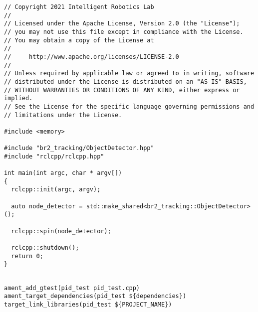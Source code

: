  \footnotesize
\begin{tcolorbox}[sharp corners, colframe=gray!80, colback=LightGray, left=0pt, top=0pt, bottom=0pt, title=\texttt{br2\_tracking/src/object\_detector\_main.cpp}]
  \begin{verbatim}
// Copyright 2021 Intelligent Robotics Lab
//
// Licensed under the Apache License, Version 2.0 (the "License");
// you may not use this file except in compliance with the License.
// You may obtain a copy of the License at
//
//     http://www.apache.org/licenses/LICENSE-2.0
//
// Unless required by applicable law or agreed to in writing, software
// distributed under the License is distributed on an "AS IS" BASIS,
// WITHOUT WARRANTIES OR CONDITIONS OF ANY KIND, either express or implied.
// See the License for the specific language governing permissions and
// limitations under the License.

#include <memory>

#include "br2_tracking/ObjectDetector.hpp"
#include "rclcpp/rclcpp.hpp"

int main(int argc, char * argv[])
{
  rclcpp::init(argc, argv);

  auto node_detector = std::make_shared<br2_tracking::ObjectDetector>();

  rclcpp::spin(node_detector);

  rclcpp::shutdown();
  return 0;
}
    \end{verbatim}
    \end{tcolorbox}
  \normalsize

 \footnotesize
\begin{tcolorbox}[sharp corners, colframe=gray!80, colback=LightGray, left=0pt, top=0pt, bottom=0pt, title=\texttt{br2\_tracking/tests/CMakeLists.txt}]
  \begin{verbatim}

ament_add_gtest(pid_test pid_test.cpp)
ament_target_dependencies(pid_test ${dependencies})
target_link_libraries(pid_test ${PROJECT_NAME})
    \end{verbatim}
    \end{tcolorbox}
  \normalsize

